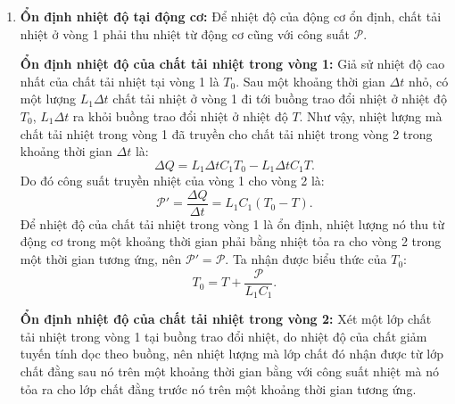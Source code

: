 \begin{enumerate}
    \item \textbf{Ổn định nhiệt độ tại động cơ:} Để nhiệt độ của động cơ ổn định, chất tải nhiệt ở vòng 1 phải thu nhiệt từ động cơ cũng với công suất $\mathcal{P}$.

    \textbf{Ổn định nhiệt độ của chất tải nhiệt trong vòng 1:} Giả sử nhiệt độ cao nhất của chất tải nhiệt tại vòng 1 là $T_0$. Sau một khoảng thời gian $\Delta t$ nhỏ, có một lượng $L_1 \Delta t$ chất tải nhiệt ở vòng 1 đi tới buồng trao đổi nhiệt ở nhiệt độ $T_0$, $L_1 \Delta t$ ra khỏi buồng trao đổi nhiệt ở nhiệt độ $T$. Như vậy, nhiệt lượng mà chất tải nhiệt trong vòng 1 đã truyền cho chất tải nhiệt trong vòng 2 trong khoảng thời gian $\Delta t$ là:
    \begin{equation}
        \Delta Q= L_1 \Delta t C_1 T_0 - L_1 \Delta t C_1 T.
    \end{equation}
    Do đó công suất truyền nhiệt của vòng 1 cho vòng 2 là:
    \begin{equation}
        \mathcal{P'}=\dfrac{\Delta Q}{\Delta t}=L_1 C_1 (T_0-T).
    \end{equation}
    Để nhiệt độ của chất tải nhiệt trong vòng 1 là ổn định, nhiệt lượng nó thu từ động cơ trong một khoảng thời gian phải bằng nhiệt tỏa ra cho vòng 2 trong một thời gian tương ứng, nên $\mathcal{P'}=\mathcal{P}$. Ta nhận được biểu thức của $T_0$:
    \begin{equation}
        T_0=T+\dfrac{\mathcal{P}}{L_1 C_1}.
    \end{equation}

    \textbf{Ổn định nhiệt độ của chất tải nhiệt trong vòng 2:} Xét một lớp chất tải nhiệt trong vòng 1 tại buồng trao đổi nhiệt, do nhiệt độ của chất giảm tuyến tính dọc theo buồng, nên nhiệt lượng mà lớp chất đó nhận được từ lớp chất đằng sau nó trên một khoảng thời gian bằng với công suất nhiệt mà nó tỏa ra cho lớp chất đằng trước nó trên một khoảng thời gian tương ứng.

    \begin{figure}[!h]
        \centering
\end{figure}
\end{enumerate}
